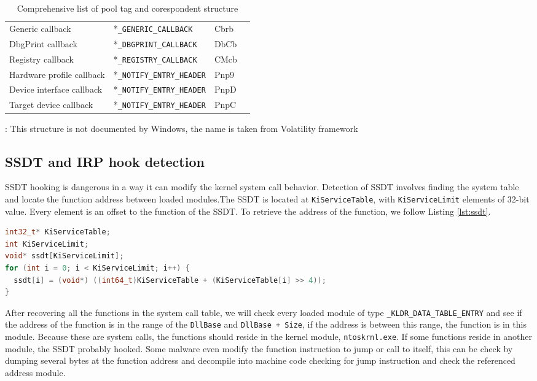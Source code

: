 \begin{table}[]
\begin{tabular}{llll}
  Generic callback          & *\texttt{\_GENERIC\_CALLBACK}      & Cbrb           &                       \\
  DbgPrint callback         & *\texttt{\_DBGPRINT\_CALLBACK}     & DbCb           &                       \\
  Registry callback         & *\texttt{\_REGISTRY\_CALLBACK}     & CMcb           &                       \\
  Hardware profile callback & *\texttt{\_NOTIFY\_ENTRY\_HEADER}  & Pnp9           &                       \\
  Device interface callback & *\texttt{\_NOTIFY\_ENTRY\_HEADER}  & PnpD           &                       \\
  Target device callback    & *\texttt{\_NOTIFY\_ENTRY\_HEADER}  & PnpC           &                       \\
\hline
\end{tabular}
  {\raggedright *: This structure is not documented by Windows, the name is taken
  from Volatility framework \par}
  \caption{Comprehensive list of pool tag and corespondent structure}
  \label{tab:pooltag}
\end{table}

\subsection[SSDT and IRP hook detection]{SSDT and IRP hook detection}

SSDT hooking is dangerous in a way it can modify the kernel system call
behavior.  Detection of SSDT involves finding the system table and locate the
function address between loaded modules.The SSDT is located at
\texttt{KiServiceTable}, with \texttt{KiServiceLimit} elements of 32-bit value.
Every element is an offset to the function of the SSDT. To retrieve the address
of the function, we follow Listing \ref{lst:ssdt}.


\begin{lstlisting}[language=cpp,caption={Retrieve SSDT functions},label={lst:ssdt},float,floatplacement=H]
int32_t* KiServiceTable;
int KiServiceLimit;
void* ssdt[KiServiceLimit];
for (int i = 0; i < KiServiceLimit; i++) {
  ssdt[i] = (void*) ((int64_t)KiServiceTable + (KiServiceTable[i] >> 4));
}
\end{lstlisting}

After recovering all the functions in the system call table, we will check
every loaded module of type \texttt{\_KLDR\_DATA\_TABLE\_ENTRY} and see if the
address of the function is in the range of the \texttt{DllBase} and
\texttt{DllBase + Size}, if the address is between this range, the function is
in this module.  Because these are system calls, the functions should reside in
the kernel module, \texttt{ntoskrnl.exe}. If some functions reside in another
module, the SSDT probably hooked. Some malware even modify the function
instruction to jump or call to itself, this can be check by dumping several
bytes at the function address and decompile into machine code checking for jump
instruction and check the referenced address module.

